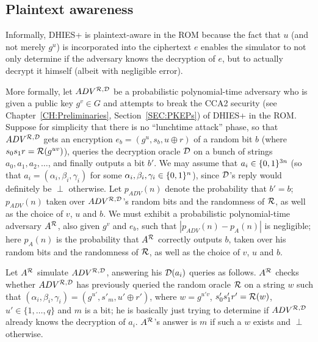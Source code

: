 \subsection{Plaintext awareness}
\label{SEC:Plaintext}
Informally, DHIES+ is plaintext-aware in the ROM because the fact that $u$
(and not merely $g^u$) is incorporated into the ciphertext $e$ enables the
simulator to not only determine if the adversary knows the decryption of $e$,
but to actually decrypt it himself (albeit with negligible error). 

More formally, let $ADV^{\mathcal{R},\mathcal{D}}$ be a probabilistic polynomial-time
adversary who is given a public key $g^v \in G$ and attempts to break the CCA2
security (see Chapter~\ref{CH:Preliminaries}, Section~\ref{SEC:PKEPs}) of
DHIES+ in the ROM. Suppose for simplicity that there is no ``lunchtime
attack'' phase, so that $ADV^{\mathcal{R},\mathcal{D}}$ gets an encryption $e_b =
(g^u,s_b,u \oplus r)$ of a random bit $b$ (where $s_0s_1r = \mathcal{R}(g^{uv})$),
queries the decryption oracle $\mathcal{D}$ on a bunch of strings
$a_0,a_1,a_2,\ldots$, and finally outputs a bit $b'$. We may assume 
that $a_i \in \{0,1\}^{3n}$ (so that $a_i = (\alpha_i,
\beta_i, \gamma_i)$ for some $\alpha_i, \beta_i, \gamma_i \in \{0,1\}^{n}$), 
since $\mathcal{D}$'s reply would definitely be $\perp$ otherwise. 
Let $p_{ADV}(n)$ denote the probability that $b' = b$; $p_{ADV}(n)$ taken over
$ADV^{\mathcal{R},\mathcal{D}}$'s random bits and the randomness of $\mathcal{R}$, as well as
the choice of $v$, $u$ and $b$.  We must exhibit a probabilistic
polynomial-time adversary $A^{\mathcal{R}}$, also given $g^v$ and $e_b$, such that
$|p_{ADV}(n)-p_A(n)|$ is negligible; here $p_A(n)$ is the probability that
$A^{\mathcal{R}}$ correctly outputs $b$, taken over his random bits and the randomness
of $\mathcal{R}$, as well as the choice of $v$, $u$ and $b$. 

Let $A^{\mathcal{R}}$ simulate $ADV^{\mathcal{R},\mathcal{D}}$, answering his $\mathcal{D}(a_i)$ queries
as follows.
$A^{\mathcal{R}}$ checks whether $ADV^{\mathcal{R},\mathcal{D}}$ has previously queried the random
oracle $\mathcal{R}$ on a string $w$ such that $(\alpha_i,\beta_i,\gamma_i) =
(g^{u'},s'_{m},u' \oplus r')$, where $w = g^{u'v}$, $s'_0s'_1r' =
\mathcal{R}(w)$, $u' \in \{1,\ldots,q\}$ and $m$ is a bit; he is
basically just trying to determine if $ADV^{\mathcal{R},\mathcal{D}}$ already knows the
decryption of $a_i$.  $A^{\mathcal{R}}$'s answer is $m$ if such a $w$ exists and $\perp$
otherwise. 

